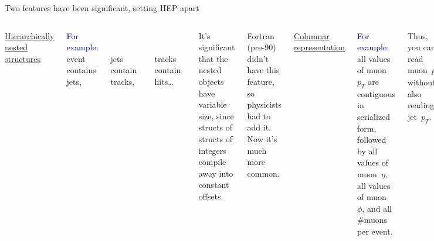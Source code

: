 \documentclass[aspectratio=169]{beamer}
\begin{document}
\begin{frame}{Two features have been significant, setting HEP apart}
\vspace{0.5 cm}
\begin{columns}[t]
\underline{\Large Hierarchically nested structures}

\vspace{0.35 cm}
\textcolor{darkblue}{For example:} event contains jets,

\textcolor{white}{For example:} \hspace{0.5 cm}jets contain tracks,

\textcolor{white}{For example:} \hspace{1 cm}tracks contain hits\ldots

\vspace{0.35 cm}
It's significant that the nested objects have variable size, since structs of structs of integers compile away into constant offsets.

\vspace{0.35 cm}
Fortran (pre-90) didn't have this feature, so physicists had to add it. Now it's much more common.

\underline{\Large Columnar representation}

\vspace{0.35 cm}
\textcolor{darkblue}{For example:} all values of muon~$p_T$ are contiguous in serialized form, followed by all values of muon~$\eta$, all values of muon~$\phi$, and all \#muons per event.

\vspace{0.35 cm}
Thus, you can read muon~$p_T$ without also reading jet~$p_T$.

\vspace{0.35 cm}
Easy for flat data: just a transpose.

There are several techniques for solving it in general (hot CS topic in early 2000's).
\end{columns}
\end{frame}
\end{document}
